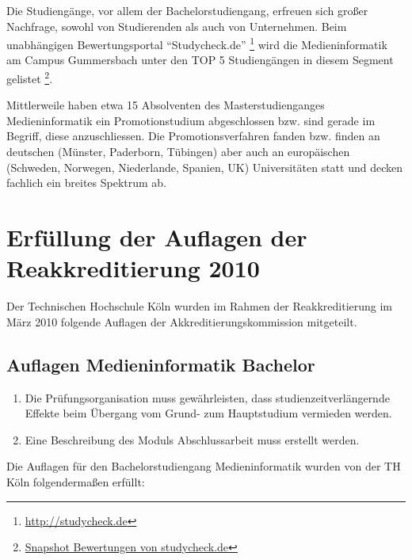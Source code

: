 Die Studiengänge, vor allem der Bachelorstudiengang, erfreuen sich
großer Nachfrage, sowohl von Studierenden als auch von Unternehmen. Beim
unabhängigen Bewertungsportal ``Studycheck.de'' \footnote{\url{http://studycheck.de}}
wird die Medieninformatik am Campus Gummersbach unter den TOP 5
Studiengängen in diesem Segment gelistet \footnote{\href{https://th-koeln.github.io/mi-2017/anhaenge/eva-snapshot_2017_02_17_bewertungen_studiengang_medieninformatik_auf_studycheck_._de.pdf}{Snapshot
  Bewertungen von studycheck.de}}.

Mittlerweile haben etwa 15 Absolventen des Masterstudienganges
Medieninformatik ein Promotionstudium abgeschlossen bzw. sind gerade im
Begriff, diese anzuschliessen. Die Promotionsverfahren fanden bzw.
finden an deutschen (Münster, Paderborn, Tübingen) aber auch an
europäischen (Schweden, Norwegen, Niederlande, Spanien, UK)
Universitäten statt und decken fachlich ein breites Spektrum ab.

\section{Erfüllung der Auflagen der Reakkreditierung
2010}\label{erfuxfcllung-der-auflagen-der-reakkreditierung-2010}

Der Technischen Hochschule Köln wurden im Rahmen der Reakkreditierung im
März 2010 folgende Auflagen der Akkreditierungskommission mitgeteilt.

\subsection{Auflagen Medieninformatik
Bachelor}\label{auflagen-medieninformatik-bachelor}

\begin{siderules}
\begin{enumerate}
\def\labelenumi{\arabic{enumi}.}
\tightlist
\item
  Die Prüfungsorganisation muss gewährleisten, dass
  studienzeitverlängernde Effekte beim Übergang vom Grund- zum
  Hauptstudium vermieden werden.
\item
  Eine Beschreibung des Moduls Abschlussarbeit muss erstellt werden.
\end{enumerate}
\end{siderules}

Die Auflagen für den Bachelorstudiengang Medieninformatik wurden von der
TH Köln folgendermaßen erfüllt:

